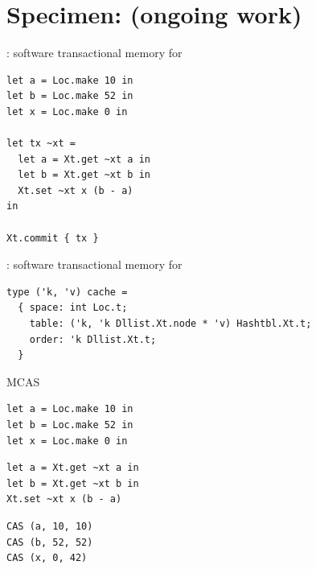\newcommand{\kcas}{%
  \kappa%
}

\newcommand{\similar}{%
  \approx%
}
\newcommand{\nonsimilar}{%
  \not\approx
}

\newcommand{\view}{%
  \mathcal{V}%
}
\newcommand{\viewTwo}{%
  \mathcal{W}%
}
\newcommand{\viewJoin}[2]{%
  #1 \sqcup #2%
}

\newcommand{\iKcasPointsto}{%
  \rightarrowtail%
}
\newcommand{\iView}[1]{%
  \sqsupseteq #1%
}

\newcommand{\colorLoc}{blue}
\newcommand{\colorBefore}{red}
\newcommand{\colorAfter}{Green}
\newcommand{\colorReadOnly}{cyan}
\newcommand{\colorResult}{orange}
\newcommand{\colorView}{brown}


\section{Specimen: \Kcas (ongoing work)}

\begin{frame}[fragile]{\Kcas: software transactional memory for \OCaml}
\Large
\begin{verbatim}
let a = Loc.make 10 in
let b = Loc.make 52 in
let x = Loc.make 0 in

let tx ~xt =
  let a = Xt.get ~xt a in
  let b = Xt.get ~xt b in
  Xt.set ~xt x (b - a)
in

Xt.commit { tx }
\end{verbatim}
\end{frame}

\begin{frame}[fragile]{\Kcas: software transactional memory for \OCaml}
\centering
\Large
\begin{verbatim}
type ('k, 'v) cache =
  { space: int Loc.t; 
    table: ('k, 'k Dllist.Xt.node * 'v) Hashtbl.Xt.t;
    order: 'k Dllist.Xt.t;
  }
\end{verbatim}
\end{frame}

\begin{frame}[fragile]{MCAS}
\LARGE
\begin{verbatim}
let a = Loc.make 10 in
let b = Loc.make 52 in
let x = Loc.make 0 in
\end{verbatim}
\vfill
\begin{minipage}{0.5\textwidth}
  \begin{verbatim}
let a = Xt.get ~xt a in
let b = Xt.get ~xt b in
Xt.set ~xt x (b - a)
  \end{verbatim}
\end{minipage}
\hfill
\begin{minipage}{0.4\textwidth}
  \begin{verbatim}
CAS (a, 10, 10)
CAS (b, 52, 52)
CAS (x, 0, 42)
  \end{verbatim}
\end{minipage}
\end{frame}


